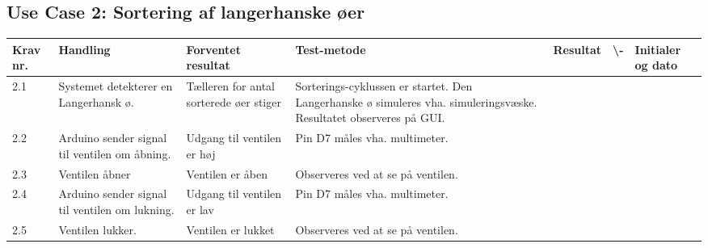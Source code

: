  \subsection{Use Case 2: Sortering af langerhanske øer}
\begin{center}
		\begin{longtable}{ | m{1.785cm} | m{1.785cm}| m{1.785cm}| m{1.785cm}| m{1.785cm}| m{1.785cm}|m{1.785cm}| } 
			\hline
			\textbf{Krav nr.} &\textbf{ Handling} & \textbf{Forventet resultat} & \textbf{Test-metode} &\textbf{Resultat} & \textbf{ \checkmark \textbackslash -} & \textbf{Initialer og dato} \\ 
			
			\hline
			2.1 &  Systemet detekterer en Langerhansk ø. & Tælleren for antal sorterede øer stiger & Sorterings-cyklussen er startet. Den Langerhanske ø simuleres vha. simuleringsvæske. Resultatet observeres på GUI.  &  & & \\
			
			
			\hline
			2.2 &  Arduino sender signal til ventilen om åbning. & Udgang til ventilen er høj & Pin D7 måles vha. multimeter. &  & & \\
			\hline
			
			2.3 &  Ventilen åbner  & Ventilen er åben & Observeres ved at se på ventilen.  &  & & \\
			\hline
			
			2.4 &  Arduino sender signal til ventilen om lukning.  & Udgang til ventilen er lav & Pin D7 måles vha. multimeter.  &  & & \\
			\hline
			
			2.5 &  Ventilen lukker. & Ventilen er lukket & Observeres ved at se på ventilen. &  & & \\
			\hline
			
			
		\end{longtable}
		
	\end{center}
	\pagebreak